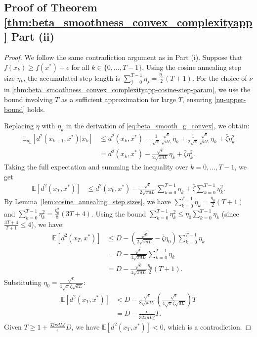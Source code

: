 \documentclass{article}
\newcommand{\pert}{\nu}
\theoremstyle{plain}
\theoremstyle{definition}
\theoremstyle{remark}
\begin{document}
\subsection{Proof of Theorem \ref{thm:beta_smoothness_convex_complexityapp} Part (ii)}\label{pf:beta_smoothness_convex_complexity_cosine}
\begin{proof}
We follow the same contradiction argument as in Part (i). Suppose that $f(x_k) \geq f(x^*) + \epsilon$ for all $k \in \{0, \dots, T-1\}$.
Using the cosine annealing step size $\eta_k$, the accumulated step length is $\sum_{j=0}^{T-1}\eta_j = \frac{\eta_0}{2}(T+1)$. For the choice of $\pert$ in \eqref{thm:beta_smoothness_convex_complexityapp-cosine-step-param}, we use the bound involving $T$ as a sufficient approximation for large $T$, ensuring \eqref{nu-upper-bound} holds.

Replacing $\eta$ with $\eta_k$ in the derivation of \eqref{eq:beta_smooth_g_convex}, we obtain:
\begin{align*}
\mathbb{E}_{u_k}\left[d^2(x_{k+1}, x^*)|x_k\right] 
&\leq d^2(x_k ,x^*) -\frac{1}{\sqrt{\pi}}\frac{\sqrt{\epsilon}}{\sqrt{d{L}}}\eta_k + \frac{1}{2\sqrt{\pi}}\frac{\sqrt{\epsilon}}{\sqrt{d{L}}}\eta_k + \bar\zeta\eta_k^2 \\
&= d^2(x_k ,x^*) - \frac{\sqrt{\epsilon}}{2\sqrt{\pi d{L}}}\eta_k + \bar\zeta\eta_k^2.
\end{align*}
Taking the full expectation and summing the inequality over $k=0, \dots, T-1$, we get
\begin{align*}
\mathbb{E}\left[ d^2(x_{T}, x^*) \right]
&\leq d^2(x_0, x^*) - \frac{\sqrt{\epsilon}}{2\sqrt{\pi d{L}}} \sum_{k=0}^{T-1} \eta_k + \bar\zeta \sum_{k=0}^{T-1} \eta_k^2.
\end{align*}
By Lemma~\ref{lem:cosine_annealing_step sizes}, we have $\sum_{k=0}^{T-1} \eta_k = \frac{\eta_0}{2}(T+1)$ and $\sum_{k=0}^{T-1} \eta_k^2 = \frac{\eta_0^2}{8}(3T+4)$.
Using the bound $\sum_{k=0}^{T-1} \eta_k^2 \leq \eta_0 \sum_{k=0}^{T-1} \eta_k$ (since $\frac{3T+4}{T+1} \le 4$), we have:
\begin{align*}
\mathbb{E}\left[ d^2(x_{T}, x^*) \right]
&\leq D - \left( \frac{\sqrt{\epsilon}}{2\sqrt{\pi d{L}}} - \bar\zeta \eta_0 \right) \sum_{k=0}^{T-1} \eta_k \\
&= D - \frac{\sqrt{\epsilon}}{4\sqrt{\pi d{L}}} \sum_{k=0}^{T-1} \eta_k \\
&= D - \frac{\sqrt{\epsilon}}{4\sqrt{\pi d{L}}} \frac{\eta_0}{2}(T+1).
\end{align*}
Substituting $\eta_0 = \frac{\sqrt{\epsilon}}{4\sqrt{\pi}\bar{\zeta}\sqrt{d{L}}}$:
\begin{align*}
\mathbb{E}\left[ d^2(x_{T}, x^*) \right]
&< D - \frac{\sqrt{\epsilon}}{8\sqrt{\pi d{L}}} \left( \frac{\sqrt{\epsilon}}{4\sqrt{\pi}\bar{\zeta}\sqrt{d{L}}} \right) T \\
&= D - \frac{\epsilon}{32\pi d{L}\bar{\zeta}}T.
\end{align*}
Given $T \geq 1 + \frac{32\pi d{L}\bar{\zeta}}{\epsilon}D$, we have $\mathbb{E}\left[ d^2(x_{T}, x^*) \right] < 0$, which is a contradiction.
\end{proof}
\end{document}
